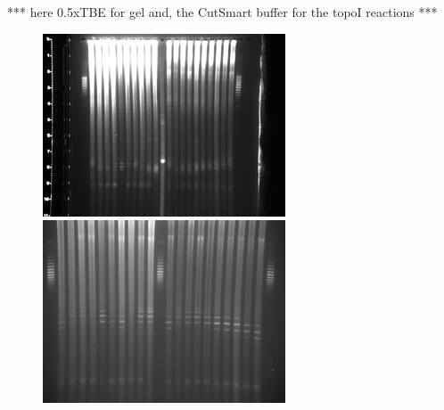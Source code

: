 \documentclass[10pt,a4]{article}
\newcommand{\TODO}[1]{\begingroup\color{red}*** #1 ***\endgroup}
\begin{document}
\TODO{here 0.5xTBE for gel and, the CutSmart buffer for the topoI
  reactions}









\begin{figure}[ht!]
  \begin{minipage}{.49\textwidth}
    \includegraphics[width=\textwidth]{figures/diurnal/Y_CQ01_high_exposure.png}
  \end{minipage}
  \begin{minipage}{.49\textwidth}
    \includegraphics[width=\textwidth]{figures/diurnal/20130618_1511.png}
  \end{minipage}
  

\end{figure}
\end{document}
